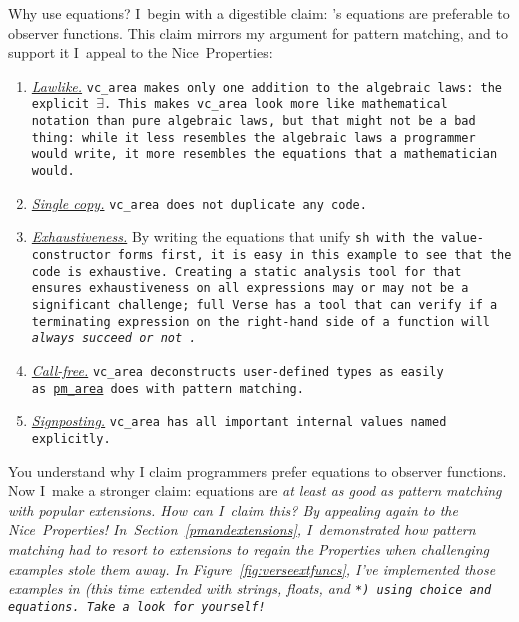 \documentclass[manuscript,screen,review, 12pt, nonacm]{acmart}
\begin{document}
    Why use equations? I~begin with a digestible claim: \VC's equations are
    preferable to observer functions. This claim mirrors my argument for pattern
    matching, and to support it I~appeal to the Nice~Properties: 

    \begin{enumerate}
      \item \hyperref[p1]{\it{Lawlike.}} 
      \tt{vc\_area} makes only one addition to the algebraic laws: the explicit
      $\exists$. This makes \tt{vc\_area} look more like mathematical notation
      than pure algebraic laws, but that might not be a bad thing: while it less
      resembles the algebraic laws a programmer would write, it more resembles
      the equations that a mathematician would. 
      \item \hyperref[p2]{\it{Single copy.}} \tt{vc\_area} does not duplicate any code. 
      \item \hyperref[p5]{\it{Exhaustiveness.}}  By writing the equations that
      unify \tt{sh} with the value-constructor forms first, it is easy in this
      example to see that the code is exhaustive. Creating a static analysis
      tool for \VC that ensures exhaustiveness on all expressions may or may not
      be a significant challenge; full Verse has a tool that can verify if a
      terminating expression on the right-hand side of a function will
      \it{always succeed} or not~\citep{peyton-jones2024verification}.
      \item \hyperref[p3]{\it{Call-free.}} \tt{vc\_area} deconstructs
      user-defined types as easily as~\hyperref[fig:pmarea]{\tt{pm\_area}} does
      with pattern matching. 
      \item \hyperref[p4]{\it{Signposting.}} \tt{vc\_area} has all important
      internal values named explicitly.
      
    \end{enumerate}

    You understand why I claim programmers prefer equations to observer
    functions. Now I~make a stronger claim: equations are \it{at least as good
    as} pattern matching with popular extensions. How can I~claim this? By
    appealing again to the Nice~Properties! In~Section~\ref{pmandextensions},
    I~demonstrated how pattern matching had to resort to extensions to regain
    the Properties when challenging examples stole them away. In
    Figure~\ref{fig:verseextfuncs}, I've implemented those examples in \VC (this
    time extended with strings, floats, and \tt{*}) using choice and equations.
    Take a look for yourself! 
\end{document}
